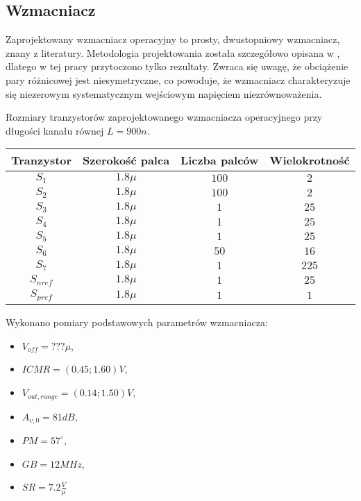 \documentclass[10pt,a4paper,twoside]{report}
\theoremstyle{definition}
\theoremstyle{definition}
\theoremstyle{definition}
\theoremstyle{definition}
\theoremstyle{definition}
\begin{document}
{{{{{{	\subsection{Wzmacniacz}
	{	Zaprojektowany wzmacniacz operacyjny to prosty, dwustopniowy wzmacniacz, znany z literatury. Metodologia projektowania została szczegółowo opisana w \cite{cmosanal}, dlatego w tej pracy przytoczono tylko rezultaty. Zwraca się uwagę, że obciążenie pary różnicowej jest niesymetryczne, co powoduje, że wzmacniacz charakteryzuje się niezerowym systematycznym wejściowym napięciem niezrównoważenia. }
	{	Rozmiary tranzystorów zaprojektowanego wzmacniacza operacyjnego przy długości kanału równej $L=900n$. 
	\begin{center}
	\begin{tabular}{|c|c|c|c|}
		\hline 
		Tranzystor & Szerokość palca & Liczba palców & Wielokrotność \\ 
		\hline 
		$S_1$ & $1.8\mu$ & $100$ & $2$ \\ 
		\hline 
		$S_2$ & $1.8\mu$ & $100$ & $2$ \\ 
		\hline 
		$S_3$ & $1.8\mu$ & $1$ & $25$ \\ 
		\hline 
		$S_4$ & $1.8\mu$ & $1$ & $25$ \\ 
		\hline 
		$S_5$ & $1.8\mu$ & $1$ & $25$ \\ 
		\hline 
		$S_6$ & $1.8\mu$ & $50$ & $16$ \\ 
		\hline 
		$S_7$ & $1.8\mu$ & $1$ & $225$ \\ 
		\hline 
		$S_{nref}$ & $1.8\mu$ & $1$ & $25$ \\ 
		\hline 
		$S_{pref}$ & $1.8\mu$ & $1$ & $1$ \\ 
		\hline 
		\end{tabular} 
	\end{center}
	}
		Wykonano pomiary podstawowych parametrów wzmacniacza:
		\begin{itemize}
			\item $ V_{off} = ??? \mu$,
			\item $ ICMR = (0.45;1.60)V$,
			\item $ V_{out,range} = (0.14;1.50)V$,
			\item $ A_{v,0} =  81dB$,
			\item $ PM = 57^\circ$,
			\item $ GB = 12MHz$,
			\item $ SR = 7.2 \frac{V}{\mu} $


		\end{itemize}
	}

}}}}}
\end{document}
